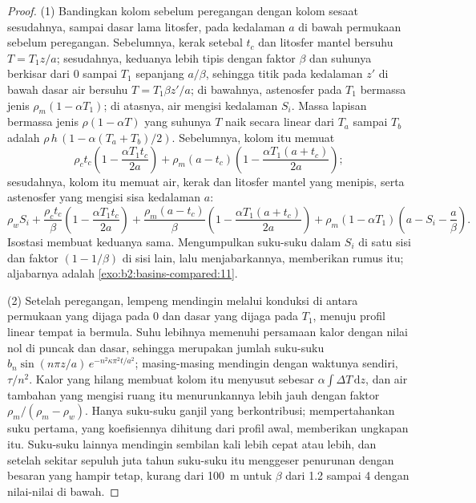 \begin{proof}
(1) Bandingkan kolom sebelum peregangan dengan kolom sesaat sesudahnya, sampai dasar lama
litosfer, pada kedalaman $a$ di bawah permukaan sebelum peregangan. Sebelumnya, kerak
setebal $t_c$ dan litosfer mantel bersuhu $T = T_1 z/a$; sesudahnya, keduanya
lebih tipis dengan faktor $\beta$ dan suhunya berkisar dari $0$ sampai $T_1$ sepanjang $a/\beta$, sehingga titik
pada kedalaman $z'$ di bawah dasar air bersuhu $T = T_1\beta z'/a$; di bawahnya, astenosfer pada
$T_1$ bermassa jenis $\rho_m(1 - \alpha T_1)$; di atasnya, air mengisi kedalaman $S_i$. Massa
lapisan bermassa jenis $\rho(1 - \alpha T)$ yang suhunya $T$ naik secara linear dari $T_a$ sampai $T_b$ adalah
$\rho\,h\,(1 - \alpha(T_a + T_b)/2)$. Sebelumnya, kolom itu memuat
\[
  \rho_c t_c\left(1 - \frac{\alpha T_1 t_c}{2a}\right)
  + \rho_m (a - t_c)\left(1 - \frac{\alpha T_1 (a + t_c)}{2a}\right);
\]
sesudahnya, kolom itu memuat air, kerak dan litosfer mantel yang menipis, serta astenosfer yang
mengisi sisa kedalaman $a$:
\[
  \rho_w S_i + \frac{\rho_c t_c}{\beta}\left(1 - \frac{\alpha T_1 t_c}{2a}\right)
  + \frac{\rho_m (a - t_c)}{\beta}\left(1 - \frac{\alpha T_1 (a + t_c)}{2a}\right)
  + \rho_m(1 - \alpha T_1)\left(a - S_i - \frac{a}{\beta}\right).
\]
Isostasi membuat keduanya sama. Mengumpulkan suku-suku dalam $S_i$ di satu sisi dan faktor
$(1 - 1/\beta)$ di sisi lain, lalu menjabarkannya, memberikan rumus itu; aljabarnya adalah
\cref{exo:b2:basins-compared:11}.

(2) Setelah peregangan, lempeng mendingin melalui konduksi di antara permukaan yang dijaga pada $0$ dan dasar yang dijaga
pada $T_1$, menuju profil linear tempat ia bermula. Suhu lebihnya memenuhi persamaan
kalor dengan nilai nol di puncak dan dasar, sehingga merupakan jumlah suku-suku
$b_n\sin(n\pi z/a)\,e^{-n^2\kappa\pi^2 t/a^2}$; masing-masing mendingin dengan waktunya sendiri, $\tau/n^2$. Kalor
yang hilang membuat kolom itu menyusut sebesar $\alpha\int \Delta T\,\mathrm{d}z$, dan air tambahan
yang mengisi ruang itu menurunkannya lebih jauh dengan faktor $\rho_m/(\rho_m - \rho_w)$. Hanya suku-suku ganjil yang
berkontribusi; mempertahankan suku pertama, yang koefisiennya dihitung dari profil awal, memberikan
ungkapan itu. Suku-suku lainnya mendingin sembilan kali lebih cepat atau lebih, dan setelah sekitar sepuluh juta tahun
suku-suku itu menggeser penurunan dengan besaran yang hampir tetap, kurang dari \qty{100}{m} untuk $\beta$ dari
1.2 sampai 4 dengan nilai-nilai di bawah.
\end{proof}

